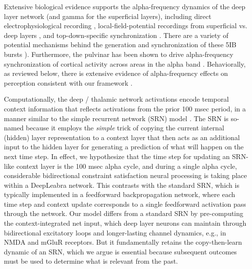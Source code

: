 \documentclass[11pt,twoside]{article}
\newif\myifpdf
\begin{document}
Extensive biological evidence supports the alpha-frequency dynamics of the deep layer network (and gamma for the superficial layers), including direct electrophysiological recording \cite{LuczakBarthoHarris13}, local-field-potential recordings from superficial vs. deep layers \cite{BuffaloFriesLandmanEtAl11,MaierAdamsAuraEtAl10,MaierAuraLeopold11,SpaakBonnefondMaierEtAl12,XingYehBurnsEtAl12,BastosVezoliBosmanEtAl15,MichalareasVezolivanPeltEtAl16}, and top-down-specific synchronization \cite{vonSteinChiangKonig00,vanKerkoerleSelfDagninoEtAl14}. There are a variety of potential mechanisms behind the generation and synchronization of these 5IB bursts ).  Furthermore, the pulvinar has been shown to drive alpha-frequency synchronization of cortical activity across areas in the alpha band \cite{SaalmannPinskWangEtAl12}.  Behaviorally, as reviewed below, there is extensive evidence of alpha-frequency effects on perception consistent with our framework  \cite{NunnOsselton74,VarelaToroJohnEtAl81,VanRullenKoch03,JensenBonnefondVanRullen12}.

Computationally, the deep / thalamic network activations encode temporal context information that reflects activations from the prior 100 msec period, in a manner similar to the simple recurrent network (SRN) model \cite{Elman90,Elman91,Jordan89}.  The SRN is so-named because it employs the {\em simple} trick of copying the current internal (hidden) layer representation to a context layer that then acts as an additional input to the hidden layer for generating a prediction of what will happen on the next time step.  In effect, we hypothesize that the time step for updating an SRN-like context layer is the 100 msec alpha cycle, and during a single alpha cycle, considerable bidirectional constraint satisfaction neural processing is taking place within a DeepLeabra network.  This contrasts with the standard SRN, which is typically implemented in a feedforward backpropagation network, where each time step and context update corresponds to a single feedforward activation pass through the network.  Our model differs from a standard SRN by pre-computing the context-integrated net input, which deep layer neurons can maintain through bidirectional excitatory loops and longer-lasting channel dynamics, e.g., in NMDA and mGluR receptors.  But it fundamentally retains the copy-then-learn dynamic of an SRN, which we argue is essential because subsequent outcomes must be used to determine what is relevant from the past.
\end{document}
